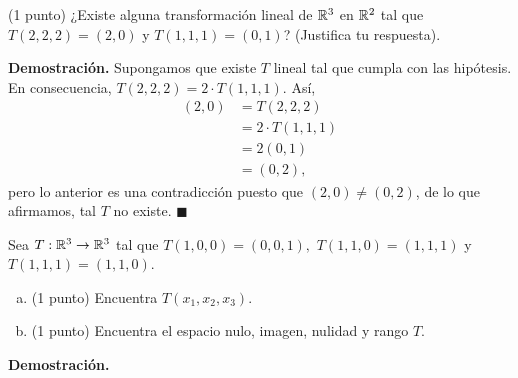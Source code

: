 \documentclass[11pt]{scrartcl}
\begin{document}
\begin{mdframed}[style=mdpurplebox, frametitle={Ejercicio 2, Tarea 09, Álgebra Lineal I}]
    (1 punto) ¿Existe alguna transformación lineal de $\mathbb R^3$ en $\mathbb R^2$ tal que $T(2,2,2)=(2,0)$ y $T(1,1,1)=(0,1)$?
    (Justifica tu respuesta).
\end{mdframed}
\textbf{Demostración.} Supongamos que existe $T$ lineal tal que cumpla con las hipótesis. En consecuencia, $T(2,2,2)=2\cdot T(1,1,1)$. Así,
\begin{align*}
    (2,0) &= T(2,2,2) \\
    &= 2\cdot T(1,1,1) \\
    &= 2(0,1) \\
    &= (0,2),
\end{align*}
pero lo anterior es una contradicción puesto que $(2,0) \neq (0,2)$, de lo que afirmamos, tal $T$ no existe. $\blacksquare$
\newpage
\begin{mdframed}[style=mdpurplebox, frametitle={Ejercicio 3, Tarea 09, Álgebra Lineal I}]
    Sea $T:\mathbb R^3\rightarrow \mathbb R^3$ tal que $T(1,0,0)=(0,0,1),$ $T(1,1,0)=(1,1,1)$ y $T(1,1,1)=(1,1,0)$.
    \begin{enumerate}[a)]
        \item (1 punto) Encuentra $T(x_1,x_2,x_3)$.
        \item (1 punto) Encuentra el espacio nulo, imagen, nulidad y rango $T$.
    \end{enumerate}
\end{mdframed}
\textbf{Demostración.}
\end{document}

